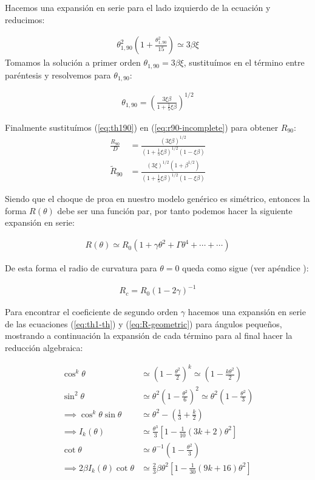 Hacemos una expansión en serie para el lado izquierdo de la ecuación y reducimos:

\begin{align}
  \theta^2_{1,90}\left(1 + \frac{\theta^2_{1,90}}{15}\right) \simeq 3\beta\xi
\end{align}
Tomamos la solución a primer orden $\theta_{1,90} = 3\beta\xi$,  sustituímos en el término entre paréntesis y resolvemos para
$\theta_{1,90}$:

\begin{align}
  \theta_{1,90} = \left(\frac{3\xi\beta}{1+\frac{1}{5}\xi\beta}\right)^{1/2} \label{eq:th190}
\end{align}

Finalmente sustituímos (\ref{eq:th190}) en (\ref{eq:r90-incomplete}) para obtener $R_{90}$:
\begin{align}
  \frac{R_{90}}{D} &= \frac{\left(3\xi\beta\right)^{1/2}}{\left(1+\frac{1}{5}\xi\beta\right)^{1/2}\left(1-\xi\beta\right)} \\
  \tilde{R}_{90} &= \frac{\left(3\xi\right)^{1/2}\left(1+\beta^{1/2}\right)}
                   {\left(1+\frac{1}{5}\xi\beta\right)^{1/2}\left(1-\xi\beta\right)} 
\end{align}

Siendo que el choque de proa en nuestro modelo genérico es simétrico, entonces la forma $R(\theta)$ debe ser una función par,
por tanto podemos hacer la siguiente expansión en serie:

\begin{align}
  R(\theta) \simeq R_0\left(1 + \gamma\theta^2 + \Gamma\theta^4 +\cdots +\cdots \right)
\end{align}

De esta forma el radio de curvatura para $\theta=0$ queda como sigue (ver apéndice ):

\begin{align}
  R_c = R_0\left(1 - 2\gamma\right)^{-1}
\end{align}

Para encontrar el coeficiente de segundo orden $\gamma$ hacemos una expansión en serie de las ecuaciones (\ref{eq:th1-th}) y
(\ref{eq:R-geometric}) para ángulos pequeños, mostrando a continuación la expansión de cada término para al final hacer la
reducción algebraica:

\begin{align}
  \cos^k\theta &\simeq \left(1 - \frac{\theta^2}{2}\right)^k \simeq \left(1 - \frac{k\theta^2}{2}\right) \\
  \sin^2\theta &\simeq \theta^2\left(1 - \frac{\theta^2}{6}\right)^2 \simeq \theta^2\left(1 - \frac{\theta^2}{3}\right)\\
  \implies \cos^k\theta\sin\theta &\simeq \theta^2 - \left(\frac{1}{3} + \frac{k}{2}\right) \\
  \implies I_k(\theta) &\simeq \frac{\theta^3}{3}\left[1 - \frac{1}{10}\left(3k + 2\right)\theta^2\right] \\
  \cot\theta &\simeq \theta^{-1}\left(1 - \frac{\theta^2}{3}\right) \\
  \implies 2\beta I_k(\theta)\cot\theta &\simeq \frac{2}{3}\beta\theta^2\left[1 - \frac{1}{30}\left(9k + 16\right)\theta^2\right]
\end{align}


